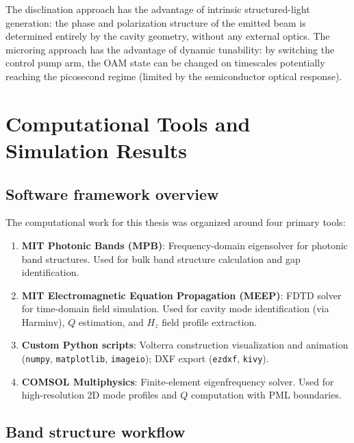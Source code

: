 \documentclass[12pt,a4paper,oneside]{book}
\theoremstyle{plain}
\theoremstyle{definition}
\theoremstyle{remark}
\begin{document}
The disclination approach has the advantage of intrinsic structured-light generation: the phase and polarization structure of the emitted beam is determined entirely by the cavity geometry, without any external optics. The microring approach has the advantage of dynamic tunability: by switching the control pump arm, the OAM state can be changed on timescales potentially reaching the picosecond regime (limited by the semiconductor optical response).

\chapter{Computational Tools and Simulation Results}
\label{chap:computation}

\section{Software framework overview}
\label{sec:software}

The computational work for this thesis was organized around four primary tools:

\begin{enumerate}
  \item \textbf{MIT Photonic Bands (MPB)}: Frequency-domain eigensolver for photonic band structures. Used for bulk band structure calculation and gap identification.
  \item \textbf{MIT Electromagnetic Equation Propagation (MEEP)}: FDTD solver for time-domain field simulation. Used for cavity mode identification (via Harminv), $Q$ estimation, and $H_z$ field profile extraction.
  \item \textbf{Custom Python scripts}: Volterra construction visualization and animation (\texttt{numpy}, \texttt{matplotlib}, \texttt{imageio}); DXF export (\texttt{ezdxf}, \texttt{kivy}).
  \item \textbf{COMSOL Multiphysics}: Finite-element eigenfrequency solver. Used for high-resolution 2D mode profiles and $Q$ computation with PML boundaries.
\end{enumerate}

\section{Band structure workflow}
\label{sec:band-workflow}
\end{document}
